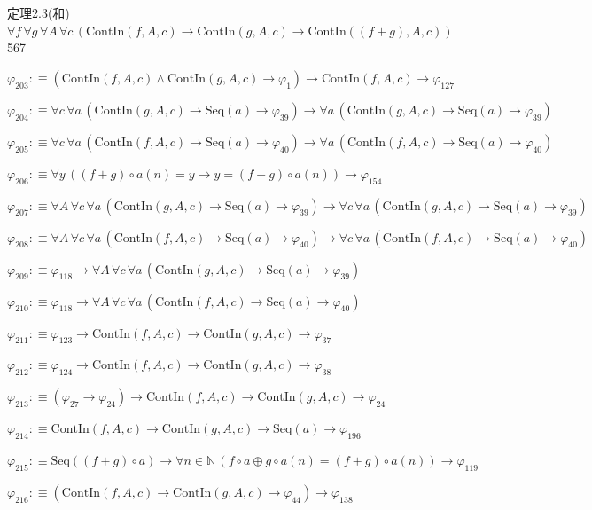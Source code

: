 \begin{fullproof}{定理2.3(和)}{$\forall f\,\forall g\,\forall A\,\forall c\,(\mathrm{ContIn}(f,A,c) \to \mathrm{ContIn}(g,A,c) \to \mathrm{ContIn}((f + g),A,c))$}{567}
\begin{abbrevlist}
\item $\varphi_{203} :\equiv (\mathrm{ContIn}(f,A,c) \land \mathrm{ContIn}(g,A,c) \to \varphi_{1}) \to \mathrm{ContIn}(f,A,c) \to \varphi_{127}$
\item $\varphi_{204} :\equiv \forall c\,\forall a\,(\mathrm{ContIn}(g,A,c) \to \mathrm{Seq}(a) \to \varphi_{39}) \to \forall a\,(\mathrm{ContIn}(g,A,c) \to \mathrm{Seq}(a) \to \varphi_{39})$
\item $\varphi_{205} :\equiv \forall c\,\forall a\,(\mathrm{ContIn}(f,A,c) \to \mathrm{Seq}(a) \to \varphi_{40}) \to \forall a\,(\mathrm{ContIn}(f,A,c) \to \mathrm{Seq}(a) \to \varphi_{40})$
\item $\varphi_{206} :\equiv \forall y\,((f + g) \circ a(n) = y \to y = (f + g) \circ a(n)) \to \varphi_{154}$
\item $\varphi_{207} :\equiv \forall A\,\forall c\,\forall a\,(\mathrm{ContIn}(g,A,c) \to \mathrm{Seq}(a) \to \varphi_{39}) \to \forall c\,\forall a\,(\mathrm{ContIn}(g,A,c) \to \mathrm{Seq}(a) \to \varphi_{39})$
\item $\varphi_{208} :\equiv \forall A\,\forall c\,\forall a\,(\mathrm{ContIn}(f,A,c) \to \mathrm{Seq}(a) \to \varphi_{40}) \to \forall c\,\forall a\,(\mathrm{ContIn}(f,A,c) \to \mathrm{Seq}(a) \to \varphi_{40})$
\item $\varphi_{209} :\equiv \varphi_{118} \to \forall A\,\forall c\,\forall a\,(\mathrm{ContIn}(g,A,c) \to \mathrm{Seq}(a) \to \varphi_{39})$
\item $\varphi_{210} :\equiv \varphi_{118} \to \forall A\,\forall c\,\forall a\,(\mathrm{ContIn}(f,A,c) \to \mathrm{Seq}(a) \to \varphi_{40})$
\item $\varphi_{211} :\equiv \varphi_{123} \to \mathrm{ContIn}(f,A,c) \to \mathrm{ContIn}(g,A,c) \to \varphi_{37}$
\item $\varphi_{212} :\equiv \varphi_{124} \to \mathrm{ContIn}(f,A,c) \to \mathrm{ContIn}(g,A,c) \to \varphi_{38}$
\item $\varphi_{213} :\equiv (\varphi_{27} \to \varphi_{24}) \to \mathrm{ContIn}(f,A,c) \to \mathrm{ContIn}(g,A,c) \to \varphi_{24}$
\item $\varphi_{214} :\equiv \mathrm{ContIn}(f,A,c) \to \mathrm{ContIn}(g,A,c) \to \mathrm{Seq}(a) \to \varphi_{196}$
\item $\varphi_{215} :\equiv \mathrm{Seq}((f + g) \circ a) \to \forall n \in \mathbb{N}\,(f \circ a \oplus g \circ a(n) = (f + g) \circ a(n)) \to \varphi_{119}$
\item $\varphi_{216} :\equiv (\mathrm{ContIn}(f,A,c) \to \mathrm{ContIn}(g,A,c) \to \varphi_{44}) \to \varphi_{138}$

\end{abbrevlist}
\end{fullproof}
